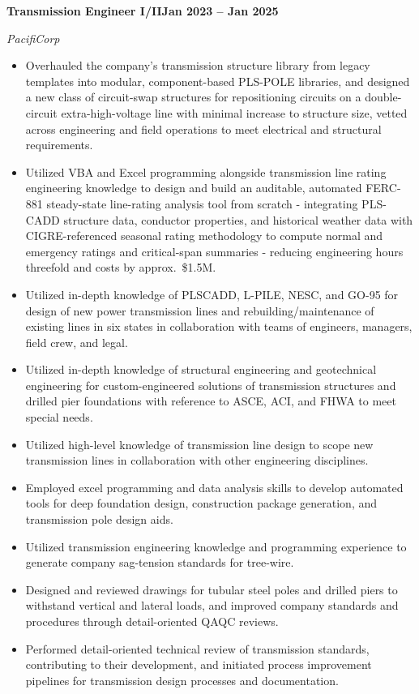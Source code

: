 \documentclass[10pt, letterpaper]{article}
\newcommand{\jobline}[2]{%
  \vspace{5pt}%
  \noindent\textbf{#1}\hfill\textbf{#2}\par%
  \vspace{1pt}%
}
\newcommand{\subline}[1]{%
  \vspace{-1pt}%
  \noindent\textit{#1}\par%
  \vspace{1pt}%
}
\newenvironment{rlist}{%
  \begin{itemize}[leftmargin=1.4em, itemsep=1pt, topsep=2pt, parsep=0pt]%
}{%
  \end{itemize}%
}
\begin{document}
\jobline{Transmission Engineer I/II}{Jan 2023 -- Jan 2025}
\subline{PacifiCorp}
\begin{rlist}
  \item Overhauled the company's transmission structure library from legacy templates into modular, component-based PLS-POLE libraries, and designed a new class of circuit-swap structures for repositioning circuits on a double-circuit extra-high-voltage line with minimal increase to structure size, vetted across engineering and field operations to meet electrical and structural requirements.
  \item Utilized VBA and Excel programming alongside transmission line rating engineering knowledge to design and build an auditable, automated FERC-881 steady-state line-rating analysis tool from scratch - integrating PLS-CADD structure data, conductor properties, and historical weather data with CIGRE-referenced seasonal rating methodology to compute normal and emergency ratings and critical-span summaries - reducing engineering hours threefold and costs by approx.\ \$1.5M.
  \item Utilized in-depth knowledge of PLSCADD, L-PILE, NESC, and GO-95 for design of new power transmission lines and rebuilding/maintenance of existing lines in six states in collaboration with teams of engineers, managers, field crew, and legal.
  \item Utilized in-depth knowledge of structural engineering and geotechnical engineering for custom-engineered solutions of transmission structures and drilled pier foundations with reference to ASCE, ACI, and FHWA to meet special needs.
  \item Utilized high-level knowledge of transmission line design to scope new transmission lines in collaboration with other engineering disciplines.
  \item Employed excel programming and data analysis skills to develop automated tools for deep foundation design, construction package generation, and transmission pole design aids.
  \item Utilized transmission engineering knowledge and programming experience to generate company sag-tension standards for tree-wire.
  \item Designed and reviewed drawings for tubular steel poles and drilled piers to withstand vertical and lateral loads, and improved company standards and procedures through detail-oriented QAQC reviews.
  \item Performed detail-oriented technical review of transmission standards, contributing to their development, and initiated process improvement pipelines for transmission design processes and documentation.
\end{rlist}
\end{document}
